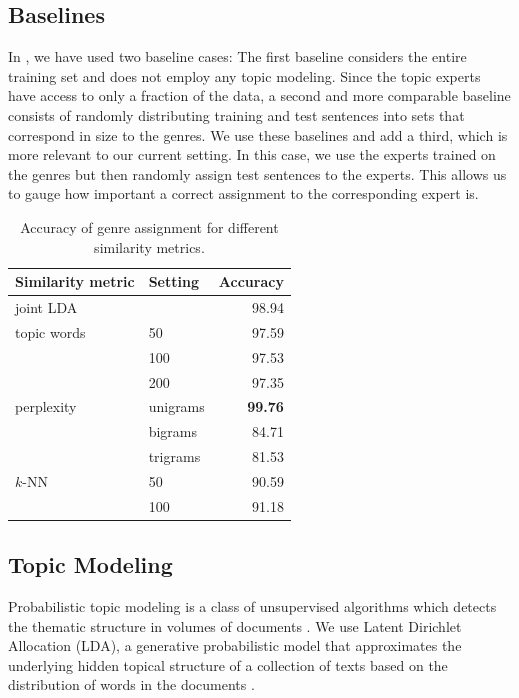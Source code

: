 \subsection{Baselines}

In , we have used two baseline cases: The first baseline considers the entire training set and does not employ any topic modeling. Since the topic experts have access to only a fraction of the data, a second and more comparable baseline consists of  randomly distributing  training and test sentences into sets that correspond in size to the genres. We use these baselines and add a third, which is more relevant to our current setting. In this case, we use the experts trained on the genres but then randomly assign test sentences to the experts. This allows us to gauge how important a correct assignment to the corresponding expert is. 

\begin{table}[t!]
\centering
\begin{tabular}{l|l|r|}
Similarity metric & Setting & Accuracy \\ \hline
joint LDA & & 98.94 \\ \hline
topic words & 50 & 97.59 \\ 
 & 100 & 97.53 \\ 
 & 200 & 97.35 \\ \hline
perplexity & unigrams & \textbf{99.76} \\ 
 & bigrams & 84.71 \\  
 & trigrams & 81.53 \\ \hline
$k$-NN & 50 & 90.59 \\ 
 & 100 & 91.18 \\ \hline
\end{tabular}
\caption{Accuracy of genre assignment for different similarity metrics.}
\label{tab:acc:class:simmetr}
\end{table}


\subsection{Topic Modeling}

Probabilistic topic modeling is a class of unsupervised algorithms which detects the thematic structure in volumes of documents \cite{Blei:2012:PTM:2133806.2133826}. We use Latent Dirichlet Allocation (LDA),  a generative probabilistic model that approximates the underlying hidden topical structure of a collection of texts based on the distribution of words in the documents \cite{Blei:2003:LDA:944919.944937}.

